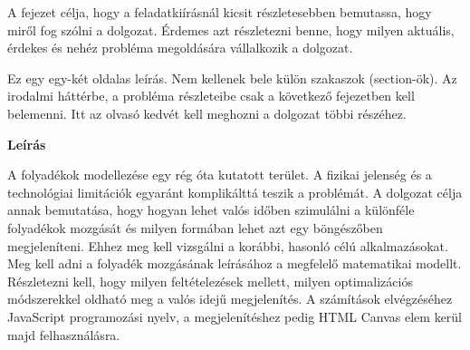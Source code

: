 
A fejezet célja, hogy a feladatkiírásnál kicsit részletesebben bemutassa, hogy miről fog szólni a dolgozat.
Érdemes azt részletezni benne, hogy milyen aktuális, érdekes és nehéz probléma megoldására vállalkozik a dolgozat.

Ez egy egy-két oldalas leírás.
Nem kellenek bele külön szakaszok (section-ök).
Az irodalmi háttérbe, a probléma részleteibe csak a következő fejezetben kell belemenni.
Itt az olvasó kedvét kell meghozni a dolgozat többi részéhez.

\textbf{Leírás}

A folyadékok modellezése egy rég óta kutatott terület. A fizikai jelenség és a technológiai limitációk egyaránt komplikálttá teszik a problémát. A dolgozat célja annak bemutatása, hogy hogyan lehet valós időben szimulálni a különféle folyadékok mozgását és milyen formában lehet azt egy böngészőben megjeleníteni. Ehhez meg kell vizsgálni a korábbi, hasonló célú alkalmazásokat. Meg kell adni a folyadék mozgásának leírásához a megfelelő matematikai modellt. Részletezni kell, hogy milyen feltételezések mellett, milyen optimalizációs módszerekkel oldható meg a valós idejű megjelenítés. A számítások elvégzéséhez JavaScript programozási nyelv, a megjelenítéshez pedig HTML Canvas elem kerül majd felhasználásra.

